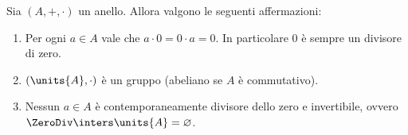 \begin{proposition} 
    \label{prop:prop_anelli}
    Sia $(A, +, \cdot)$ un anello. Allora valgono le seguenti affermazioni:
    \begin{enumerate}[label={(\roman*)}, ref={\theproposition: (\roman*)}]
        \item \label{prop:prop_anelli:per_0} Per ogni $a \in A$ vale che $a \cdot 0 = 0 \cdot a = 0$. In particolare $0$ è sempre un divisore di zero.
        \item \label{prop:prop_anelli:gruppo_inv} $(\units{A}, \cdot)$ è un gruppo (abeliano se $A$ è commutativo).
        \item \label{prop:prop_anelli:div_zero_inv} Nessun $a \in A$ è contemporaneamente divisore dello zero e invertibile, ovvero $\ZeroDiv \inters \units{A} = \varnothing$.
    \end{enumerate}
\end{proposition}

